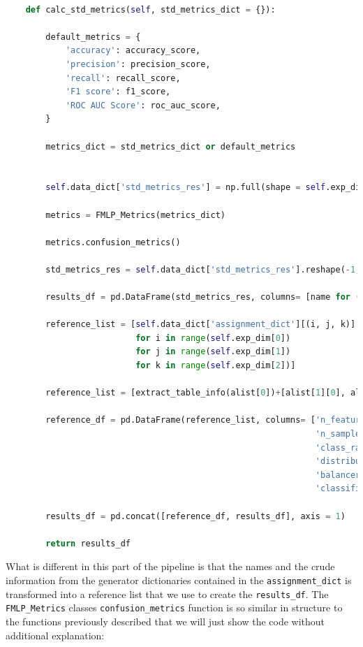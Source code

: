 \begin{lstlisting}[language=Python, numbers=none]

    def calc_std_metrics(self, std_metrics_dict = {}):

        default_metrics = {
            'accuracy': accuracy_score,
            'precision': precision_score,
            'recall': recall_score,
            'F1 score': f1_score,
            'ROC AUC Score': roc_auc_score,
        }

        metrics_dict = std_metrics_dict or default_metrics


        self.data_dict['std_metrics_res'] = np.full(shape = self.exp_dim + (len(metrics_dict),), fill_value = np.nan)
        
        metrics = FMLP_Metrics(metrics_dict)

        metrics.confusion_metrics()

        std_metrics_res = self.data_dict['std_metrics_res'].reshape(-1, len(metrics_dict))

        results_df = pd.DataFrame(std_metrics_res, columns= [name for (name, metr_func) in metrics.std_metric_list])

        reference_list = [self.data_dict['assignment_dict'][(i, j, k)] 
                          for i in range(self.exp_dim[0]) 
                          for j in range(self.exp_dim[1]) 
                          for k in range(self.exp_dim[2])]

        reference_list = [extract_table_info(alist[0])+[alist[1][0], alist[2][0]] for alist in reference_list]

        reference_df = pd.DataFrame(reference_list, columns= ['n_features', 
                                                              'n_samples', 
                                                              'class_ratio', 
                                                              'distributions', 
                                                              'balancer', 
                                                              'classifier'])

        results_df = pd.concat([reference_df, results_df], axis = 1)

        return results_df
\end{lstlisting}

What is different in this part of the pipeline is that the names and the crude information from the generator dictionaries contained in the \texttt{assignment\_dict}
is transformed into a reference list that we use to create the \texttt{results\_df}.
The \texttt{FMLP\_Metrics} classes \texttt{confusion\_metrics} function is so similar in structure to the functions previously described 
that we will just show the code without additional explanation:

